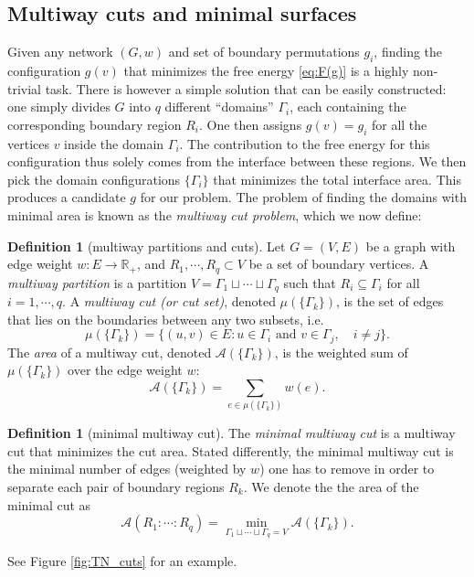 \documentclass[11pt,oneside,letterpaper]{article}
\numberwithin{equation}{section}
\theoremstyle{definition}
\newtheorem{definition}[theorem]{Definition}
\theoremstyle{remark}
\begin{document}
\subsection{Multiway cuts and minimal surfaces}
Given any network $(G,w)$ and set of boundary permutations $g_i$, finding the configuration $g(v)$ that minimizes the free energy \eqref{eq:F(g)} is a highly non-trivial task.
There is however a simple solution that can be easily constructed: one simply divides $G$ into $q$ different ``domains'' $\Gamma_i$, each containing the corresponding boundary region $R_i$. One then assigns $g(v)=g_i$ for all the vertices $v$ inside the domain $\Gamma_i$. The contribution to the free energy for this configuration thus solely comes from the interface between these regions. We then pick the domain configurations $\{\Gamma_i\}$ that minimizes the total interface area. This produces a candidate $g$ for our problem.
The problem of finding the domains with minimal area is known as the \emph{multiway cut problem}, which we now define:

\begin{definition}[multiway partitions and cuts]
  Let $G=(V,E)$ be a graph with edge weight $w:E\to \mathbb{R}_+$, and $R_1,\cdots,R_q\subset V$ be a set of boundary vertices.
  A \emph{multiway partition} is a partition $V=\Gamma_1\sqcup\cdots\sqcup \Gamma_q$ such that $R_i\subseteq\Gamma_i$ for all $i=1,\cdots,q$.
  A \emph{multiway cut (or cut set)}, denoted $\mu(\{\Gamma_k\})$, is the set of edges that lies on the boundaries between any two subsets, i.e.
  \begin{equation}
    \mu (\{\Gamma_k\}) = \{ (u,v)\in E : u\in \Gamma_i \text{ and } v\in \Gamma_j,\quad i\ne j  \}.
  \end{equation}
  The \emph{area} of a multiway cut, denoted $\mathcal{A}(\{\Gamma_k\})$, is the weighted sum of $\mu(\{\Gamma_k\})$ over the edge weight $w$:
  \begin{equation}
    \mathcal{A}(\{\Gamma_k\}) = \sum_{e\in \mu (\{\Gamma_k\})} w(e).
  \end{equation}
\end{definition}
\begin{definition}[minimal multiway cut]
  The \emph{minimal multiway cut} is a multiway cut that minimizes the cut area. Stated differently, the minimal multiway cut is the minimal number of edges (weighted by $w$) one has to remove in order to separate each pair of boundary regions $R_k$.
  We denote the the area of the minimal cut as
  \begin{equation}
    \mathcal{A}(R_1:\cdots:R_q) = \min_{\Gamma_1\sqcup\cdots\sqcup\Gamma_q=V} \mathcal{A}(\{\Gamma_k\}).
  \end{equation}
\end{definition}
See Figure \ref{fig:TN_cuts} for an example.
\end{document}

